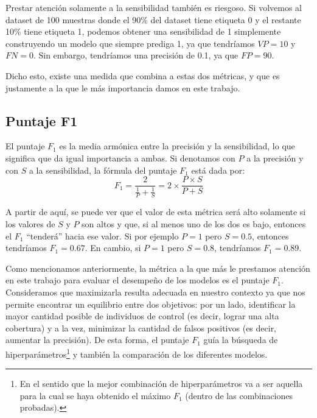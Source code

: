 \documentclass[../../main.tex]{subfiles}
\begin{document}
Prestar atención solamente a la sensibilidad también es riesgoso. Si volvemos al dataset
de 100 muestras donde el 90\% del dataset tiene etiqueta 0 y el restante 10\% tiene
etiqueta 1, podemos obtener una sensibilidad de 1 simplemente construyendo un modelo que
siempre prediga 1, ya que tendríamos \(VP=10\) y \(FN=0\). Sin embargo, tendríamos
una precisión de 0.1, ya que \(FP=90\).

Dicho esto, existe una medida que combina a estas dos métricas, y que es justamente
a la que le más importancia damos en este trabajo.

\subsection{Puntaje F1}
El puntaje \(F_1\) es la media armónica entre la precisión y la sensibilidad, lo que significa
que da igual importancia a ambas. Si denotamos con \(P\) a la precisión y con \(S\) a la
sensibilidad, la fórmula del puntaje \(F_1\) está dada por:
\[
    F_1 = \frac{2}{\frac{1}{P} + \frac{1}{S}} = 2 \times \frac{P \times S}{P + S}
\]

A partir de aquí, se puede ver que el valor de esta métrica será alto solamente si los
valores de \(S\) y \(P\) son altos y que, si al menos uno de los dos es bajo, entonces el
\(F_1\) ``tenderá'' hacia ese valor. Si por ejemplo \(P=1\) pero \(S=0.5\), entonces
tendríamos \(F_1 = 0.67\). En cambio, si \(P=1\) pero \(S=0.8\), tendríamos \(F_1 =
0.89\).

\bigskip
Como mencionamos anteriormente, la métrica a la que más le prestamos atención en este
trabajo para evaluar el desempeño de los modelos es el puntaje \(F_1\). Consideramos que
maximizarla resulta adecuada en nuestro contexto ya que nos permite encontrar un
equilibrio entre dos objetivos: por un lado, identificar la mayor cantidad posible de
individuos de control (es decir, lograr una alta cobertura) y a la vez, minimizar la
cantidad de falsos positivos (es decir, aumentar la precisión). De esta forma, el puntaje
\(F_1\) guía la búsqueda de hiperparámetros\footnote{En el sentido que la mejor
combinación de hiperparámetros va a ser aquella para la cual se haya obtenido el máximo
\(F_1\) (dentro de las combinaciones probadas).} y también la comparación de los
diferentes modelos.
\end{document}
